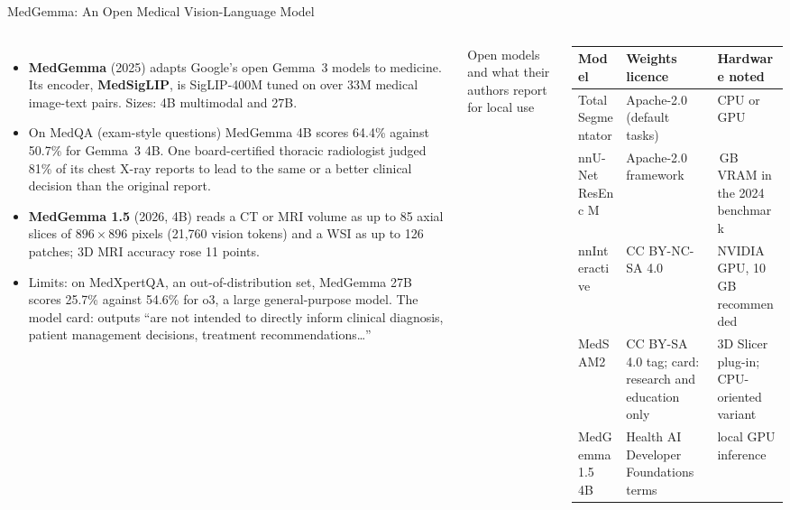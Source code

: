 \begin{frame}{MedGemma: An Open Medical Vision-Language Model}
  \begin{columns}[T,onlytextwidth]
      \begin{itemize}\scriptsize\itemsep0.3em
        \item \textbf{MedGemma} (2025) adapts Google's open Gemma~3 models to medicine. Its encoder, \textbf{MedSigLIP}, is SigLIP-400M tuned on over 33M medical image-text pairs. Sizes: 4B multimodal and 27B.
        \item On MedQA (exam-style questions) MedGemma 4B scores 64.4\% against 50.7\% for Gemma~3 4B. One board-certified thoracic radiologist judged 81\% of its chest X-ray reports to lead to the same or a better clinical decision than the original report.
        \item \textbf{MedGemma 1.5} (2026, 4B) reads a CT or MRI volume as up to 85 axial slices of $896\times896$ pixels (21,760 vision tokens) and a WSI as up to 126 patches; 3D MRI accuracy rose 11 points.
        \item Limits: on MedXpertQA, an out-of-distribution set, MedGemma 27B scores 25.7\% against 54.6\% for o3, a large general-purpose model. The model card: outputs ``are not intended to directly inform clinical diagnosis, patient management decisions, treatment recommendations\ldots''
      \end{itemize}
      \centering
      {\scriptsize Open models and what their authors report for local use\par}
      \vspace{0.3em}
      {\scriptsize
      \begin{tabular}{@{}>{\raggedright\arraybackslash}p{2.0cm} >{\raggedright\arraybackslash}p{1.85cm} >{\raggedright\arraybackslash}p{1.95cm}@{}}
        \toprule
        \textbf{Model} & \textbf{Weights licence} & \textbf{Hardware noted} \\
        \midrule
        TotalSegmentator & Apache-2.0 (default tasks) & CPU or GPU \\
        nnU-Net ResEnc M & Apache-2.0 framework & 9.1\,GB VRAM in the 2024 benchmark \\
        nnInteractive & CC BY-NC-SA 4.0 & NVIDIA GPU, 10\,GB recommended \\
        MedSAM2 & CC BY-SA 4.0 tag; card: research and education only & 3D Slicer plug-in; CPU-oriented variant \\
        MedGemma 1.5 4B & Health AI Developer Foundations terms & local GPU inference \\

\end{tabular}}
\end{columns}
\end{frame}
